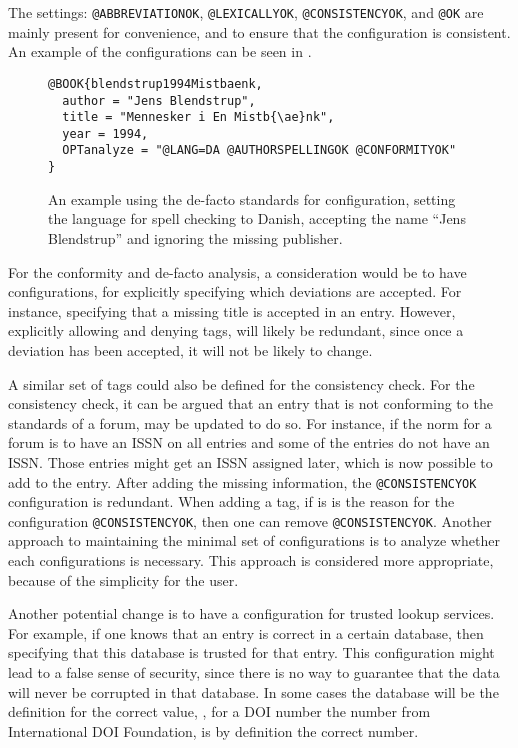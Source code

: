 The settings: \texttt{@ABBREVIATIONOK}, \texttt{@LEXICALLYOK},
\texttt{@CONSISTENCYOK}, and \texttt{@OK} are mainly present for
convenience, and to ensure that the configuration is consistent.  An
example of the configurations can be seen in
.

\begin{figure}
  \centering
\begin{verbatim}
@BOOK{blendstrup1994Mistbaenk,
  author = "Jens Blendstrup",
  title = "Mennesker i En Mistb{\ae}nk",
  year = 1994,
  OPTanalyze = "@LANG=DA @AUTHORSPELLINGOK @CONFORMITYOK"
}
\end{verbatim}
  \caption{An example using the de-facto standards for configuration,
    setting the language for spell checking to Danish, accepting the
    name ``Jens Blendstrup'' and ignoring the missing publisher.}
  \label{fig:analyzing_added_de_facto_standards}
\end{figure}


For the conformity and de-facto analysis, a consideration would be to
have configurations, for explicitly specifying which deviations are
accepted.  For instance, specifying that a missing title is accepted
in an entry.  However, explicitly allowing and denying tags, will
likely be redundant, since once a deviation has been accepted, it will
not be likely to change.

A similar set of tags could also be defined for the consistency check.
For the consistency check, it can be argued that an entry that is not
conforming to the standards of a forum, may be updated to do so.  For
instance, if the norm for a forum is to have an ISSN on all entries
and some of the entries do not have an ISSN.  Those entries might get
an ISSN assigned later, which is now possible to add to the entry.
After adding the missing information, the \texttt{@CONSISTENCYOK}
configuration is redundant.  When adding a tag, if is is the reason
for the configuration \texttt{@CONSISTENCYOK}, then one can remove
\texttt{@CONSISTENCYOK}.  Another approach to maintaining the minimal
set of configurations is to analyze whether each configurations is
necessary.  This approach is considered more appropriate, because of
the simplicity for the user.

Another potential change is to have a configuration for trusted
lookup services.  For example, if one knows that an entry is correct
in a certain database, then specifying that this database is trusted
for that entry.  This configuration might lead to a false sense of
security, since there is no way to guarantee that the data will never
be corrupted in that database.  In some cases the database will be the
definition for the correct value, \eg, for a DOI number the number
from International DOI Foundation, is by definition the correct
number.

